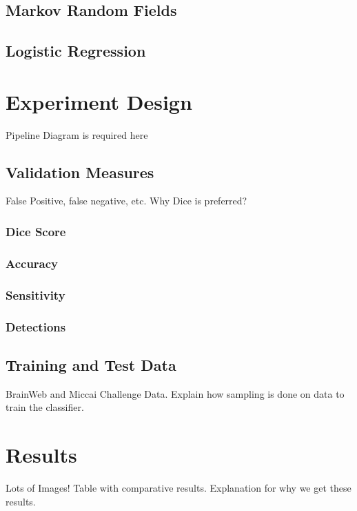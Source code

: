 \documentclass{article} %
\begin{document}
\subsection{Markov Random Fields}

\subsection{Logistic Regression}

\section{Experiment Design}
Pipeline Diagram is required here

\subsection{Validation Measures}
False Positive, false negative, etc. Why Dice is preferred?
\subsubsection{Dice Score}
\subsubsection{Accuracy}
\subsubsection{Sensitivity}
\subsubsection{Detections}

\subsection{Training and Test Data}
BrainWeb and Miccai Challenge Data. Explain how sampling is done on data to train the classifier. 

\section{Results}
Lots of Images! Table with comparative results. Explanation for why we get these results. 
\end{document}
